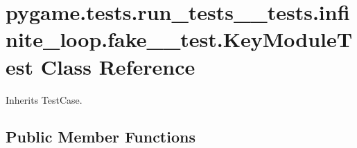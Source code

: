 \hypertarget{classpygame_1_1tests_1_1run__tests____tests_1_1infinite__loop_1_1fake__1__test_1_1_key_module_test}{}\section{pygame.\+tests.\+run\+\_\+tests\+\_\+\+\_\+tests.\+infinite\+\_\+loop.\+fake\+\_\+\_\+test.\+Key\+Module\+Test Class Reference}
\label{classpygame_1_1tests_1_1run__tests____tests_1_1infinite__loop_1_1fake__1__test_1_1_key_module_test}


Inherits Test\+Case.

\subsection*{Public Member Functions}
